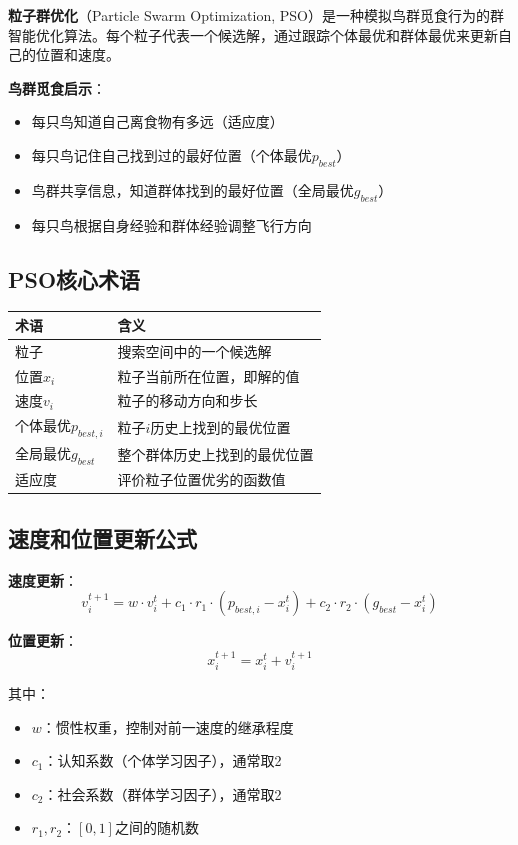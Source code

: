 \begin{conceptbox}
\textbf{粒子群优化}（Particle Swarm Optimization, PSO）是一种模拟鸟群觅食行为的群智能优化算法。每个粒子代表一个候选解，通过跟踪个体最优和群体最优来更新自己的位置和速度。
\end{conceptbox}

\textbf{鸟群觅食启示}：
\begin{itemize}[leftmargin=2em,itemsep=0pt]
    \item 每只鸟知道自己离食物有多远（适应度）
    \item 每只鸟记住自己找到过的最好位置（个体最优$p_{best}$）
    \item 鸟群共享信息，知道群体找到的最好位置（全局最优$g_{best}$）
    \item 每只鸟根据自身经验和群体经验调整飞行方向
\end{itemize}

\subsection{PSO核心术语}

\begin{table}[htbp]
\centering\small
\begin{tabular}{ll}
\toprule
\textbf{术语} & \textbf{含义} \\
\midrule
粒子 & 搜索空间中的一个候选解 \\
位置$x_i$ & 粒子当前所在位置，即解的值 \\
速度$v_i$ & 粒子的移动方向和步长 \\
个体最优$p_{best,i}$ & 粒子$i$历史上找到的最优位置 \\
全局最优$g_{best}$ & 整个群体历史上找到的最优位置 \\
适应度 & 评价粒子位置优劣的函数值 \\
\bottomrule
\end{tabular}
\end{table}

\subsection{速度和位置更新公式}

\begin{formulabox}
\textbf{速度更新}：
$$v_i^{t+1} = w \cdot v_i^t + c_1 \cdot r_1 \cdot (p_{best,i} - x_i^t) + c_2 \cdot r_2 \cdot (g_{best} - x_i^t)$$

\textbf{位置更新}：
$$x_i^{t+1} = x_i^t + v_i^{t+1}$$

其中：
\begin{itemize}[itemsep=0pt]
    \item $w$：惯性权重，控制对前一速度的继承程度
    \item $c_1$：认知系数（个体学习因子），通常取2
    \item $c_2$：社会系数（群体学习因子），通常取2
    \item $r_1, r_2$：$[0,1]$之间的随机数
\end{itemize}
\end{formulabox}

